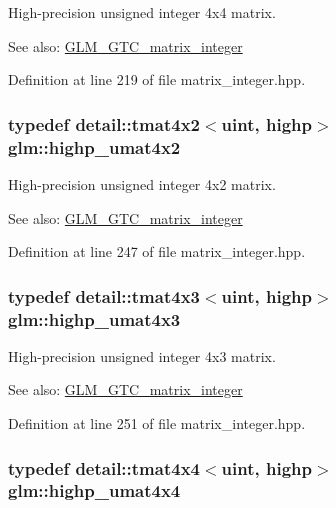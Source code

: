 High-precision unsigned integer 4x4 matrix. \begin{Desc}
\item[See also:]\hyperlink{group__gtc__matrix__integer}{GLM\_\-GTC\_\-matrix\_\-integer} \end{Desc}


Definition at line 219 of file matrix\_\-integer.hpp.\hypertarget{group__gtc__matrix__integer_g32442efcb778cb80024a17bafa781f81}{
\subsubsection[highp\_\-umat4x2]{\setlength{\rightskip}{0pt plus 5cm}typedef detail::tmat4x2$<$uint, highp$>$ {\bf glm::highp\_\-umat4x2}}}
\label{group__gtc__matrix__integer_g32442efcb778cb80024a17bafa781f81}


High-precision unsigned integer 4x2 matrix. \begin{Desc}
\item[See also:]\hyperlink{group__gtc__matrix__integer}{GLM\_\-GTC\_\-matrix\_\-integer} \end{Desc}


Definition at line 247 of file matrix\_\-integer.hpp.\hypertarget{group__gtc__matrix__integer_g763a36c57b6073ca3cac739bfbe794ba}{
\subsubsection[highp\_\-umat4x3]{\setlength{\rightskip}{0pt plus 5cm}typedef detail::tmat4x3$<$uint, highp$>$ {\bf glm::highp\_\-umat4x3}}}
\label{group__gtc__matrix__integer_g763a36c57b6073ca3cac739bfbe794ba}


High-precision unsigned integer 4x3 matrix. \begin{Desc}
\item[See also:]\hyperlink{group__gtc__matrix__integer}{GLM\_\-GTC\_\-matrix\_\-integer} \end{Desc}


Definition at line 251 of file matrix\_\-integer.hpp.\hypertarget{group__gtc__matrix__integer_ga14b7029cfaf6f26384782f5ff7acddf}{
\subsubsection[highp\_\-umat4x4]{\setlength{\rightskip}{0pt plus 5cm}typedef detail::tmat4x4$<$uint, highp$>$ {\bf glm::highp\_\-umat4x4}}}
\label{group__gtc__matrix__integer_ga14b7029cfaf6f26384782f5ff7acddf}


